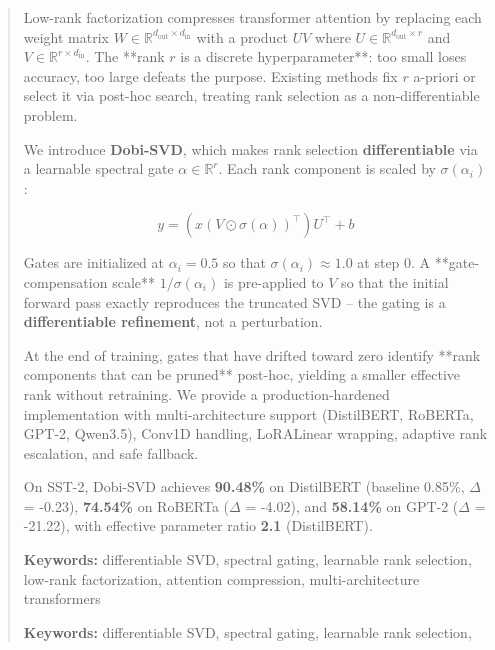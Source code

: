\documentclass{article}
\begin{document}
\maketitle

\begin{abstract}
Low-rank factorization compresses transformer attention by replacing each 
weight matrix $W \in \mathbb{R}^{d_\text{out} \times d_\text{in}}$ with a 
product $U V$ where $U \in \mathbb{R}^{d_\text{out} \times r}$ and 
$V \in \mathbb{R}^{r \times d_\text{in}}$. The **rank $r$ is a discrete 
hyperparameter**: too small loses accuracy, too large defeats the purpose. 
Existing methods fix $r$ a-priori or select it via post-hoc search, treating 
rank selection as a non-differentiable problem.

We introduce \textbf{Dobi-SVD}, which makes rank selection \textbf{differentiable} via 
a learnable spectral gate $\alpha \in \mathbb{R}^r$. Each rank component is 
scaled by $\sigma(\alpha_i)$:

\[
y = (x (V \odot \sigma(\alpha))^\top) U^\top + b
\tag{1}
\]

Gates are initialized at $\alpha_i = 0.5$ so that 
$\sigma(\alpha_i) \approx 1.0$ at step 0. A **gate-compensation 
scale** $1/\sigma(\alpha_i)$ is pre-applied to $V$ so that the initial 
forward pass exactly reproduces the truncated SVD -- the gating is a 
\textbf{differentiable refinement}, not a perturbation.

At the end of training, gates that have drifted toward zero identify **rank 
components that can be pruned** post-hoc, yielding a smaller effective rank 
without retraining. We provide a production-hardened implementation with 
multi-architecture support (DistilBERT, RoBERTa, GPT-2, Qwen3.5), Conv1D 
handling, LoRALinear wrapping, adaptive rank escalation, and safe fallback.

On SST-2, Dobi-SVD achieves \textbf{90.48\%} on DistilBERT (baseline 
0.85\%, $\Delta$ = -0.23), \textbf{74.54\%} on RoBERTa ($\Delta$ = -4.02), 
and \textbf{58.14\%} on GPT-2 ($\Delta$ = -21.22), with effective parameter 
ratio \textbf{2.1\times} (DistilBERT).

\textbf{Keywords:} differentiable SVD, spectral gating, learnable rank selection, 
low-rank factorization, attention compression, multi-architecture transformers



\vspace{0.5em}
\noindent\textbf{Keywords:} differentiable SVD, spectral gating, learnable rank selection,
\end{abstract}
\end{document}
